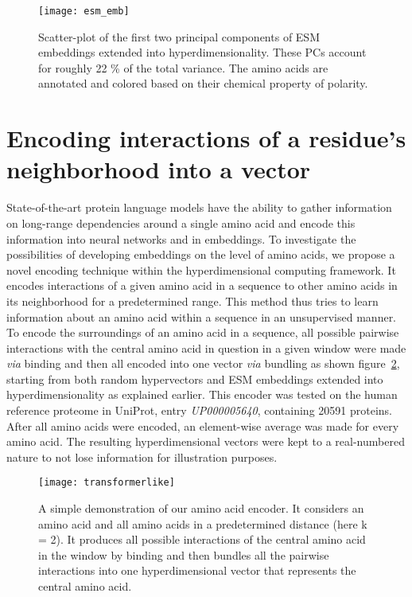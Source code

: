 \begin{figure}[H]
    \centering
    \texttt{[image: esm\_emb]}
    \caption{Scatter-plot of the first two principal components of ESM embeddings extended into hyperdimensionality. These PCs account for roughly 22 \% of the total variance. The amino acids are annotated and colored based on their chemical property of polarity.}\label{fig:AAesm}
\end{figure}

\section{Encoding interactions of a residue's neighborhood into a vector}
State-of-the-art protein language models have the ability to gather information on long-range dependencies around a single amino acid and encode this information into neural networks and in embeddings. To investigate the possibilities of developing embeddings on the level of amino acids, we propose a novel encoding technique within the hyperdimensional computing framework. It encodes interactions of a given amino acid in a sequence to other amino acids in its neighborhood for a predetermined range. This method thus tries to learn information about an amino acid within a sequence in an unsupervised manner. To encode the surroundings of an amino acid in a sequence, all possible pairwise interactions with the central amino acid in question in a given window were made \textit{via} binding and then all encoded into one vector \textit{via} bundling as shown figure~\ref{fig:AAtr}, starting from both random hypervectors and ESM embeddings extended into hyperdimensionality as explained earlier. This encoder was tested on the human reference proteome in UniProt, entry \textit{UP000005640}, containing 20591 proteins. After all amino acids were encoded, an element-wise average was made for every amino acid. The resulting hyperdimensional vectors were kept to a real-numbered nature to not lose information for illustration purposes.
\begin{figure}[H]
    \centering
    \texttt{[image: transformerlike]}
    \caption{A simple demonstration of our amino acid encoder. It considers an amino acid and all amino acids in a predetermined distance (here k = 2). It produces all possible interactions of the central amino acid in the window by binding and then bundles all the pairwise interactions into one hyperdimensional vector that represents the central amino acid.}
    \label{fig:AAtr}
\end{figure}

